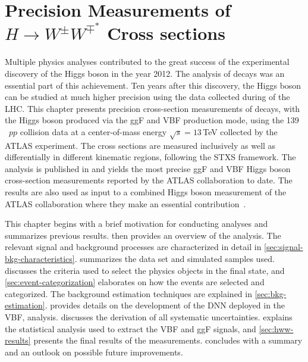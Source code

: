 \chapter{Precision Measurements of $H\rightarrow W^{\pm}W^{\mp^*}$ Cross sections}
\label{chap:hww}
Multiple physics analyses contributed to the great success of the experimental discovery of the Higgs boson in the year 2012. The analysis of \HWW decays was an essential part of this achievement. 
Ten years after this discovery, the Higgs boson can be studied at much higher precision using the data collected during \RunTwo of the LHC. 
This chapter presents precision cross-section measurements of \HWW decays, with the Higgs boson produced via the ggF and VBF production mode, using the 139\,\ifb\ $pp$ collision data at a center-of-mass energy $\sqrt{s} = 13\,$TeV collected by the ATLAS experiment.
The cross sections are measured inclusively as well as differentially in different kinematic regions, following the STXS framework.
The analysis is published in  and yields the most precise ggF and VBF Higgs boson cross-section measurements reported by the ATLAS collaboration to date.
The results are also used as input to a combined Higgs boson measurement of the ATLAS collaboration where they make an essential contribution~\cite{NaturePaper}.

This chapter begins with a brief motivation for conducting \HWW analyses and summarizes previous results.
 then provides an overview of the analysis.
The relevant signal and background processes are characterized in detail in \cref{sec:signal-bkg-characteristics}. 
 summarizes the data set and simulated samples used.
 discusses the criteria used to select the physics objects in the final state, and \cref{sec:event-categorization} elaborates on how the events are selected and categorized. 
The background estimation techniques are explained in \cref{sec:bkg-estimation}. 
 provides details on the development of the DNN deployed in the VBF, \HWW analysis. 
 discusses the derivation of all systematic uncertainties. 
 explains the statistical analysis used to extract the VBF and ggF signals, and \cref{sec:hww-results} presents the final results of the measurements.
 concludes with a summary and an outlook on possible future improvements.

